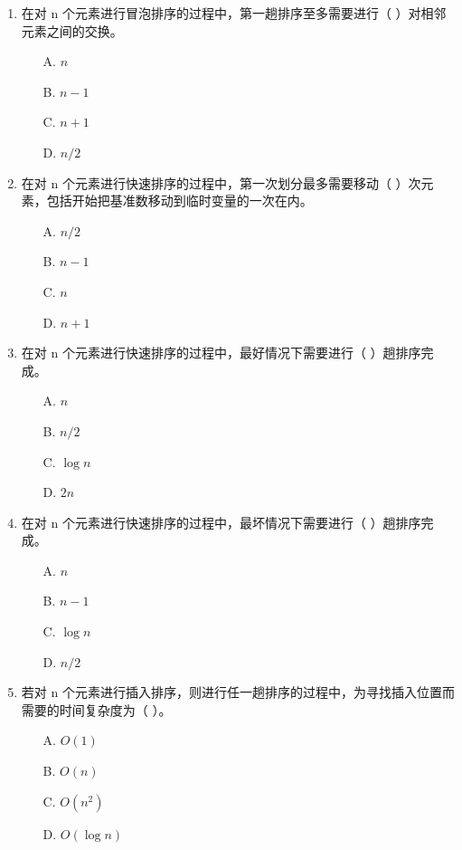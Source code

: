 \documentclass[12pt, a4paper]{article}
\begin{document}
\begin{enumerate}[label=\arabic*.]
	\item 在对 n 个元素进行冒泡排序的过程中，第一趟排序至多需要进行（ ）对相邻元素之间的交换。
	      \begin{enumerate}
		      \item[A.] $n$
		      \item[B.] $n-1$
		      \item[C.] $n+1$
		      \item[D.] $n/2$
	      \end{enumerate}

	\item 在对 n 个元素进行快速排序的过程中，第一次划分最多需要移动（ ）次元素，包括开始把基准数移动到临时变量的一次在内。
	      \begin{enumerate}
		      \item[A.] $n/2$
		      \item[B.] $n-1$
		      \item[C.] $n$
		      \item[D.] $n+1$
	      \end{enumerate}

	\item 在对 n 个元素进行快速排序的过程中，最好情况下需要进行（ ）趟排序完成。
	      \begin{enumerate}
		      \item[A.] $n$
		      \item[B.] $n/2$
		      \item[C.] $\log n$
		      \item[D.] $2n$
	      \end{enumerate}

	\item 在对 n 个元素进行快速排序的过程中，最坏情况下需要进行（ ）趟排序完成。
	      \begin{enumerate}
		      \item[A.] $n$
		      \item[B.] $n-1$
		      \item[C.] $\log n$
		      \item[D.] $n/2$
	      \end{enumerate}

	\item 若对 n 个元素进行插入排序，则进行任一趟排序的过程中，为寻找插入位置而需要的时间复杂度为（ ）。
	      \begin{enumerate}
		      \item[A.] $O(1)$
		      \item[B.] $O(n)$
		      \item[C.] $O(n^2)$
		      \item[D.] $O(\log n)$
	      \end{enumerate}


\end{enumerate}
\end{document}
